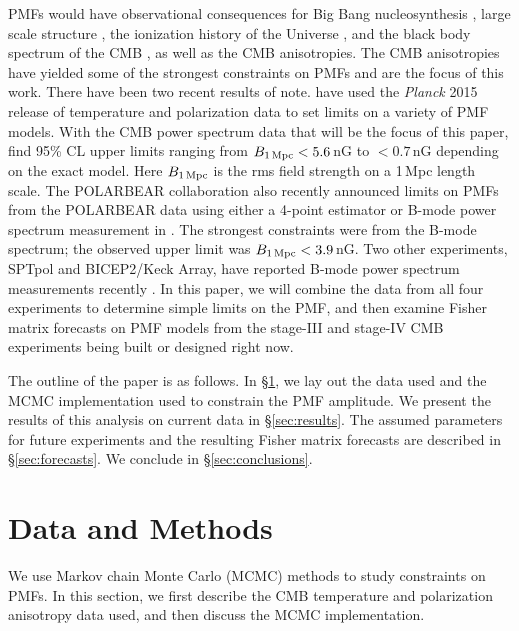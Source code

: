 \documentclass[apj]{emulateapj}
\newcommand{\bpmf}{\ensuremath{B_{\rm 1\,Mpc}}}
\newcommand{\planck}{{\sl Planck}}
\newcommand{\bicepkeck}{BICEP2/Keck Array}
\newcommand{\pb}{POLARBEAR}
\newcommand{\sptpol}{SPTpol}
\begin{document}
PMFs would have observational consequences for Big Bang nucleosynthesis \citep[e.g.,][]{kahniashvili10}, large scale structure \citep[e.g.,][]{battaner97}, the ionization history of the Universe \citep{kunze15}, and the black body spectrum of the CMB \citep[e.g.,][]{kunze14},  as well as the CMB anisotropies. 
The CMB anisotropies have yielded some of the strongest constraints on PMFs and are the focus of this work.
There have been two recent results of note. 
\citet{planck15-19} have used the \planck{} 2015 release of temperature and polarization data to set limits on a variety of PMF models. 
With the CMB power spectrum data that will be the focus of this paper, \citet{planck15-19} find 95\% CL upper limits ranging from $\bpmf < 5.6$\,nG to $<0.7$\,nG depending on the exact model. 
Here \bpmf{} is the rms field strength on a 1\,Mpc length scale. 
The \pb{} collaboration also recently announced limits on PMFs from the \pb{} data using either a 4-point estimator or B-mode power spectrum measurement in \citep{polarbear15}. 
The strongest constraints were from the B-mode spectrum; the observed upper limit was $\bpmf < 3.9$\,nG. 
Two other experiments, \sptpol{} and \bicepkeck{}, have reported B-mode power spectrum measurements recently \citep{keisler15,bicepkeck15}.
In this paper, we will combine the data from all four experiments to determine simple limits on the PMF, and then examine Fisher matrix forecasts on PMF models from the stage-III and stage-IV CMB experiments being built or designed right now. 



The outline of the paper is as follows. 
In \S\ref{sec:data}, we lay out the data used and the MCMC implementation used to constrain the PMF amplitude. 
We present the results of this analysis on current data in \S\ref{sec:results}. 
The assumed parameters for future experiments and the resulting Fisher matrix forecasts are described in \S\ref{sec:forecasts}. 
We conclude in \S\ref{sec:conclusions}. 

\section{Data and Methods}
\label{sec:data}

We use  Markov chain Monte Carlo (MCMC) methods to study constraints on PMFs. 
In this section, we first describe the CMB temperature and polarization anisotropy data used, and then discuss the MCMC implementation. 
\end{document}
